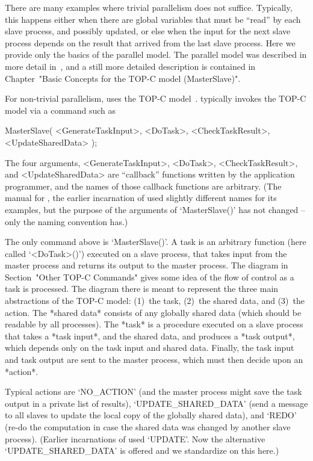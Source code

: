 
There are many examples  where  trivial  parallelism  does  not  suffice.
Typically, this happens either when there are global variables that  must
be ``read'' by each slave process, and possibly updated, or else when the
input for the next slave process depends on the result that arrived  from
the last slave process. Here we provide only the basics of  the  parallel
model. The parallel model was described in more  detail  in~\cite{Coo97},
and a still more detailed  description  is  contained  in  Chapter~"Basic
Concepts for the TOP-C model (MasterSlave)".

For non-trivial parallelism, {\ParGAP} uses the TOP-C model~\cite{Coo96}.
{\ParGAP} typically invokes the TOP-C model via a command such as

MasterSlave( <GenerateTaskInput>, <DoTask>, <CheckTaskResult>,
             <UpdateSharedData> );

The four arguments, <GenerateTaskInput>, <DoTask>, <CheckTaskResult>, and
<UpdateSharedData> are ``callback'' functions written by the  application
programmer, and the names of those callback functions are arbitrary. (The
manual for , the  earlier  incarnation  of  {\ParGAP}
used slightly different names for its examples, but the  purpose  of  the
arguments  of  `MasterSlave()'  has  not  changed  --  only  the   naming
convention has.)

The only {\ParGAP}  command  above  is  `MasterSlave()'.  A  task  is  an
arbitrary  function  (here  called  `<DoTask>()')  executed  on  a  slave
process, that takes input from the master process and returns its  output
to the master process. The  diagram  in  Section~"Other  TOP-C  Commands"
gives some idea of the flow of  control  as  a  task  is  processed.  The
diagram there is meant to represent the three main  abstractions  of  the
TOP-C model: (1)~the task, (2)~the shared data, and (3)~the  action.  The
*shared data* consists of any  globally  shared  data  (which  should  be
readable by all processes). The *task* is a procedure executed on a slave
process that takes a *task input*, and the shared data,  and  produces  a
*task output*, which depends only on the  task  input  and  shared  data.
Finally, the task input and task output are sent to the  master  process,
which must then decide upon an *action*.

Typical actions are `NO_ACTION' (and the master process  might  save  the
task output in a private list of results), `UPDATE_SHARED_DATA'  (send  a
message to all slaves to update the local copy  of  the  globally  shared
data), and `REDO' (re-do the computation in  case  the  shared  data  was
changed by another slave process).  (Earlier  incarnations  of  {\ParGAP}
used `UPDATE'. Now the alternative `UPDATE_SHARED_DATA' is offered and we
standardize on this here.)

